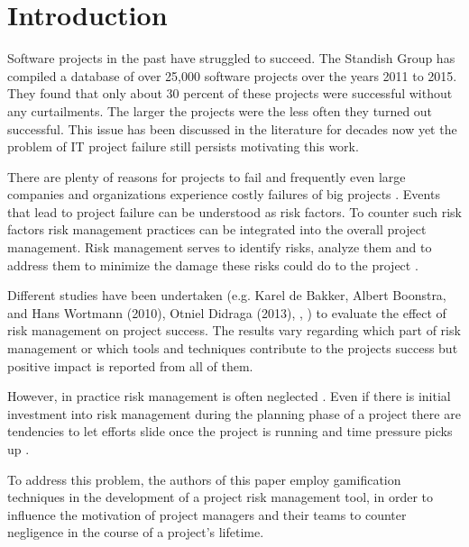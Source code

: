 \chapter{Introduction}
\label{ch:introduction}

Software projects in the past have struggled to succeed. The Standish Group \cite{thestandishgroupinternationalincChaosReport20152015} has compiled a database of over 25,000 software projects over the years 2011 to 2015. They found that only about 30 percent of these projects were successful without any curtailments. The larger the projects were the less often they turned out successful. This issue has been discussed in the literature for decades now yet the problem of IT project failure still persists motivating this work. \cite{thestandishgroupinternationalincChaosReport20152015}

There are plenty of reasons for projects to fail and frequently even large companies and organizations experience costly failures of big projects \cite{dwivediResearchInformationSystems2015}. Events that lead to project failure can be understood as risk factors. To counter such risk factors risk management practices can be integrated into the overall project management. Risk management serves to identify risks, analyze them and to address them to minimize the damage these risks could do to the project \cite{teschITProjectRisk2007}.

Different studies have been undertaken (e.g. Karel de Bakker, Albert Boonstra, and Hans Wortmann (2010), Otniel Didraga (2013), \cite{kwakProjectRiskManagement2004}, \cite{peixotoProjectRiskManagement2014}) to evaluate the effect of risk management on project success. The results vary regarding which part of risk management or which tools and techniques contribute to the projects success but positive impact is reported from all of them.

However, in practice risk management is often neglected \cite{kwakProjectRiskManagement2004}. Even if there is initial investment into risk management during the planning phase of a project there are tendencies to let efforts slide once the project is running and time pressure picks up \cite{peixotoProjectRiskManagement2014}.

To address this problem, the authors of this paper employ gamification techniques in the development of a project risk management tool, in order to influence the motivation of project managers and their teams to counter negligence in the course of a project’s lifetime.

